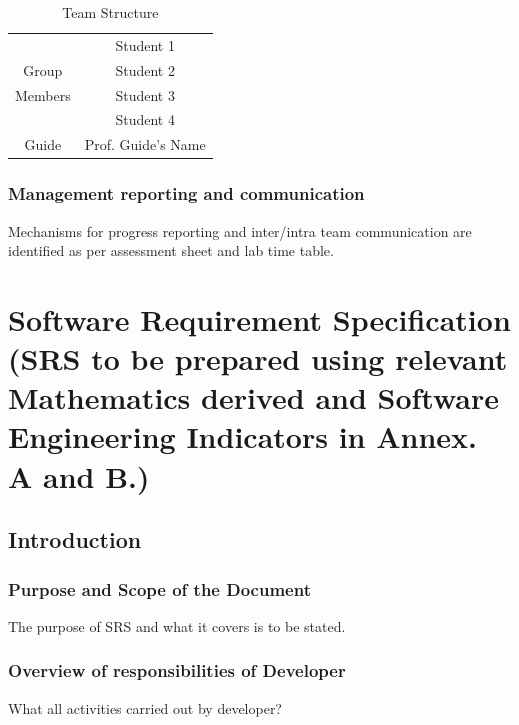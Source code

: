 \documentclass{report} %
\begin{document}
			\begin{table}[H]
				\centering
				\renewcommand{\arraystretch}{1.5}
				\begin{tabular}{|c|c|}
					\hline
					& Student 1 \\
					\cline{2-2}
					Group & Student 2 \\
					\cline{2-2}
					Members & Student 3 \\
					\cline{2-2}
					& Student 4 \\
					\hline
					Guide & Prof. Guide's Name \\
					\hline
				\end{tabular}
				\caption{Team Structure}
			\end{table}
			
			\subsection{Management reporting and communication}
			Mechanisms for progress reporting and inter/intra team communication are identified
			as per assessment sheet and lab time table.
		
		
	\chapter{Software Requirement Specification (SRS to be prepared using relevant Mathematics derived and Software Engineering Indicators in Annex. A and B.)}
	\pagebreak
		\section{Introduction}	
			
			\subsection{Purpose and Scope of the Document}
			The purpose of SRS and what it covers is to be stated. \\
			\lipsum[4]
			
			\subsection{Overview of responsibilities of Developer}
			What all activities carried out by developer? \\
			\lipsum[4]
			
\end{document}
